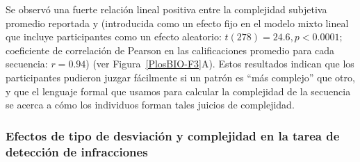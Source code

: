 Se observó una fuerte relación lineal positiva entre la complejidad subjetiva promedio reportada y \mdlbin (introducida como un efecto fijo en el modelo mixto lineal que incluye participantes como un efecto aleatorio: $t (278) = 24.6, p < 0.0001;$ coeficiente de correlación de Pearson en las calificaciones promedio para cada secuencia: $r = 0.94$) (ver Figura~\ref{PlosBIO-F3}A). Estos resultados indican que los participantes pudieron juzgar fácilmente si un patrón es ``más complejo'' que otro, y que el lenguaje formal que usamos para calcular la complejidad de la secuencia se acerca a cómo los individuos forman tales juicios de complejidad.

\subsubsection*{Efectos de tipo de desviación y complejidad en la tarea de detección de infracciones}



